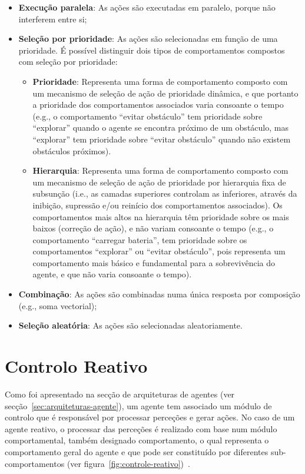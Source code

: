 \begin{itemize}
    \item \textbf{Execução paralela}: As ações são executadas em paralelo, porque não interferem entre si;
    \item \textbf{Seleção por prioridade}: As ações são selecionadas em função de uma prioridade.
    É possível distinguir dois tipos de comportamentos compostos com seleção por prioridade:
    \begin{itemize}
        \item \textbf{Prioridade}: Representa uma forma de comportamento composto com um mecanismo de seleção de ação de prioridade dinâmica, e que portanto a prioridade dos comportamentos associados varia consoante o tempo (e.g., o comportamento ``evitar obstáculo'' tem prioridade sobre ``explorar'' quando o agente se encontra próximo de um obstáculo, mas ``explorar'' tem prioridade sobre ``evitar obstáculo'' quando não existem obstáculos próximos).
        \item \textbf{Hierarquia}: Representa uma forma de comportamento composto com um mecanismo de seleção de ação de prioridade por hierarquia fixa de subsunção (i.e., as camadas superiores controlam as inferiores, através da inibição, supressão e/ou reinício dos comportamentos associados).
        Os comportamentos mais altos na hierarquia têm prioridade sobre os mais baixos (correção de ação), e não variam consoante o tempo (e.g., o comportamento ``carregar bateria'', tem prioridade sobre os comportamentos ``explorar'' ou ``evitar obstáculo'', pois representa um comportamento mais básico e fundamental para a sobrevivência do agente, e que não varia consoante o tempo).
    \end{itemize}
    \item \textbf{Combinação}: As ações são combinadas numa única resposta por composição (e.g., soma vectorial);
    \item \textbf{Seleção aleatória}: As ações são selecionadas aleatoriamente.
\end{itemize}


\section{Controlo Reativo}\label{sec:controlo-reativo}

Como foi apresentado na secção de arquiteturas de agentes (ver secção~\ref{sec:arquiteturas-agente}), um agente tem associado um módulo de controlo que é responsável por processar perceções e gerar ações.
No caso de um agente reativo, o processar das perceções é realizado com base num módulo comportamental,
também designado comportamento, o qual representa o comportamento geral do agente e que pode ser constituído por diferentes sub-comportamentos (ver figura~\ref{fig:controle-reativo})~\cite{isel:iasa:slides:arq-agentes-reativos-parte-2}.

